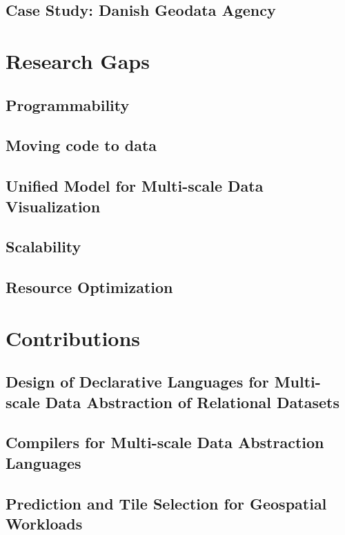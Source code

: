 \documentclass[11pt, oneside]{report}   	%
\begin{document}
\subsection{Case Study: Danish Geodata Agency}

\section{Research Gaps}
\subsection{Programmability}
\subsection{Moving code to data}
\subsection{Unified Model for Multi-scale Data Visualization}
\subsection{Scalability}
\subsection{Resource Optimization}


\section{Contributions}
\subsection{Design of Declarative Languages for Multi-scale Data Abstraction of Relational Datasets}
\subsection{Compilers for Multi-scale Data Abstraction Languages}
\subsection{Prediction and Tile Selection for Geospatial Workloads}
\end{document}
